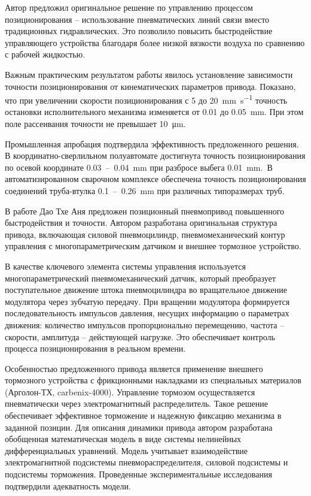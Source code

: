 Автор предложил оригинальное решение по управлению процессом
позиционирования -- использование пневматических линий связи вместо традиционных гидравлических.
Это позволило повысить быстродействие управляющего устройства благодаря более низкой
вязкости воздуха по сравнению с рабочей жидкостью.

Важным практическим результатом работы явилось установление зависимости точности позиционирования
от кинематических параметров привода. Показано, что при увеличении скорости позиционирования
с \num{5} до \num{20}~\si{\milli\metre\per\second} точность остановки исполнительного механизма изменяется от \num{0,01}
до \num{0,05}~\si{\milli\metre}.
При этом поле рассеивания точности не превышает 10~\si{\micro\metre}.

Промышленная апробация подтвердила эффективность предложенного решения. В
координатно-сверлильном полуавтомате достигнута точность позиционирования
по осевой координате \num{0.03}~--~\num{0.04}~\si{\milli\metre} при разбросе выбега \num{0.01}~\si{\milli\metre}.\
В автоматизированном сварочном комплексе обеспечена точность позиционирования
соединений труба-втулка \num{0.1}~--~\num{0.26}~\si{\milli\metre} при различных типоразмерах труб.

В работе Дао Тхе Аня \cite{DaoTheAnh2016} предложен позиционный пневмопривод
повышенного быстродействия и точности.
Автором разработана оригинальная структура привода, включающая силовой пневмоцилиндр, пневмомеханический
контур управления с многопараметрическим датчиком и внешнее тормозное устройство.

В качестве ключевого элемента системы управления используется многопараметрический
пневмомеханический датчик, который преобразует поступательное движение штока пневмоцилиндра
во вращательное движение модулятора через зубчатую передачу. При вращении модулятора формируется
последовательность импульсов давления, несущих информацию о параметрах движения: количество импульсов
пропорционально перемещению, частота -- скорости, амплитуда -- действующей нагрузке. Это обеспечивает
контроль процесса позиционирования в реальном времени.

Особенностью предложенного привода является применение внешнего тормозного устройства с фрикционными
накладками из специальных материалов (Арголон-ТХ, carbenix-4000). Управление тормозом осуществляется
пневматически через электромагнитный распределитель. Такое решение обеспечивает эффективное торможение
и надежную фиксацию механизма в заданной позиции.
Для описания динамики привода автором разработана обобщенная математическая модель в виде системы нелинейных
дифференциальных уравнений. Модель учитывает взаимодействие электромагнитной подсистемы пневмораспределителя,
силовой подсистемы и подсистемы торможения. Проведенные экспериментальные исследования подтвердили адекватность модели.

